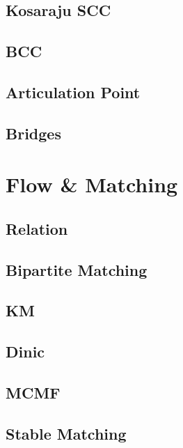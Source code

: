     \subsection{Kosaraju SCC}
        
    \subsection{BCC}
        
    \subsection{Articulation Point}
        
    \subsection{Bridges}
        

\section{Flow \& Matching}
    \subsection{Relation}
        
    \subsection{Bipartite Matching}
        
    \subsection{KM}
        
    \subsection{Dinic}
        
    \subsection{MCMF}
        
    \subsection{Stable Matching}
        

